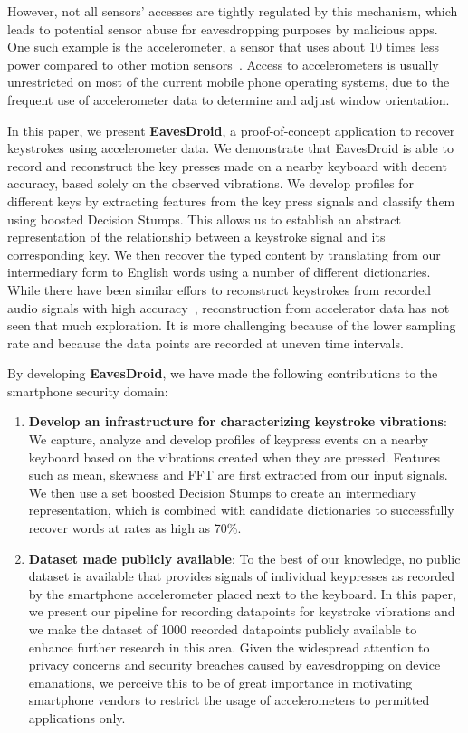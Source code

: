 \documentclass[11pt,conference]{IEEEtran}
\begin{document}
\noindent However, not all sensors' accesses are tightly regulated by this mechanism, which leads to potential sensor abuse for eavesdropping purposes by malicious apps.
One such example is the accelerometer, a sensor that uses about 10 times less power compared to other motion sensors~\cite{accelerometer-energy}.
Access to accelerometers is usually unrestricted on most of the current mobile phone operating systems, due to the frequent use of accelerometer data to determine and adjust window orientation.

\noindent In this paper, we present \textbf{EavesDroid}, a proof-of-concept application to recover keystrokes using 
accelerometer data. We demonstrate that EavesDroid is able to record and reconstruct the key presses made on a nearby keyboard with decent accuracy, based solely on the observed vibrations. We develop profiles for different keys by extracting features from the key press signals and classify them using boosted Decision Stumps. This allows us to establish an abstract representation of the relationship between a keystroke signal and its corresponding key. We then recover the typed content
by translating from our intermediary form to English words using a number
of different dictionaries.
While there have been similar effors to reconstruct keystrokes from recorded audio signals with high accuracy~\cite{zhuang2005keyboard},
 reconstruction from accelerator data has not seen that much exploration. It is more challenging because of the lower sampling rate and because the data points are recorded at uneven time intervals.

\noindent By developing \textbf{EavesDroid}, we have made the following contributions to the smartphone security domain:
\begin{enumerate}
\item {\bf Develop an infrastructure for characterizing keystroke vibrations}: We
capture, analyze and develop profiles of keypress events on a nearby
keyboard based on the vibrations created when they are pressed. Features such as mean, skewness and FFT are first extracted from our input signals. We then use a set boosted Decision Stumps to create an intermediary
representation, which is combined with candidate dictionaries
to successfully recover words at rates as high as 70\%.
\item {\bf Dataset made publicly available}: To the best of our knowledge,
no public dataset is available that provides signals of individual keypresses as recorded by the smartphone accelerometer placed next to the keyboard. In this paper, we present our pipeline for recording datapoints for keystroke vibrations and we make the dataset of 1000 recorded datapoints publicly available to enhance further research in this area. Given
the widespread attention to privacy concerns and security breaches caused by eavesdropping on device emanations, we perceive this to be
of great importance in motivating smartphone vendors
to restrict the usage of accelerometers to permitted applications only.\\
\end{enumerate}
\end{document}

